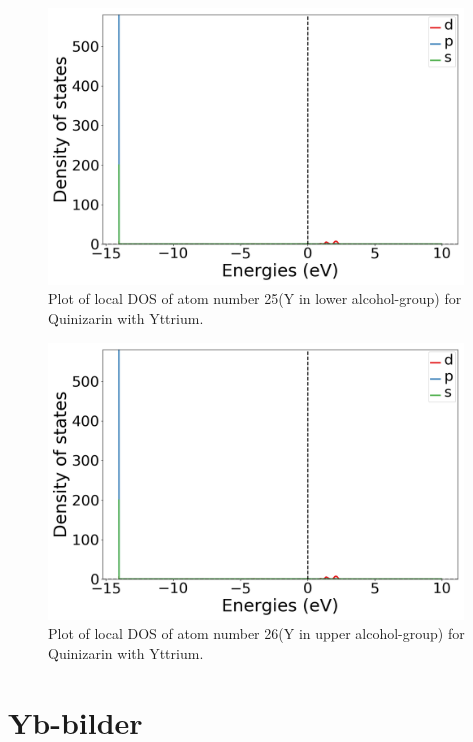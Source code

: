 \documentclass{article}
\begin{document}
  \begin{figure}[H]
      \centering
      \includegraphics[width = 11cm]{../fig/Y_LDOS25_1.png}
      \caption{Plot of local DOS of atom number 25(Y in lower alcohol-group) for Quinizarin with Yttrium. }
      \label{fig:Y_LDOS25_1.png}
  \end{figure}

  \begin{figure}[H]
      \centering
      \includegraphics[width = 11cm]{../fig/Y_LDOS26_1.png}
      \caption{Plot of local DOS of atom number 26(Y in upper alcohol-group) for Quinizarin with Yttrium. }
      \label{fig:Y_LDOS26_1.png}
  \end{figure}

\vspace{1cm}

\section{Yb-bilder}
\end{document}
